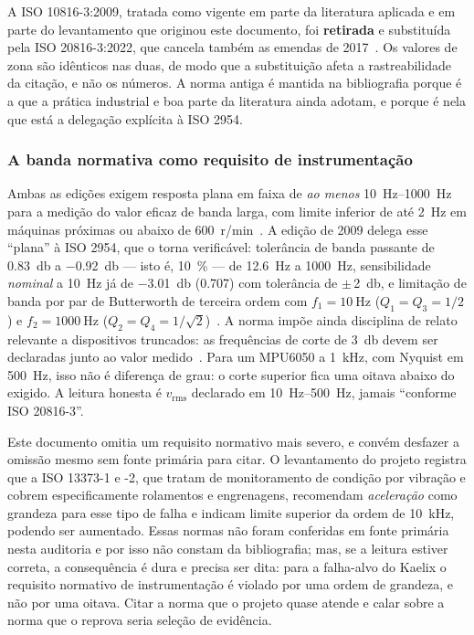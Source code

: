 \documentclass[11pt,a4paper]{article}
\begin{document}
A ISO 10816-3:2009, tratada como vigente em parte da literatura aplicada e em parte do
levantamento que originou este documento, foi \textbf{retirada} e substituída pela
ISO 20816-3:2022, que cancela também as emendas de
2017~\cite{iso108163_2009,iso208163_2022}. Os valores de zona são idênticos nas duas, de
modo que a substituição afeta a rastreabilidade da citação, e não os números. A norma
antiga é mantida na bibliografia porque é a que a prática industrial e boa parte da
literatura ainda adotam, e porque é nela que está a delegação explícita à ISO 2954.

\subsubsection{A banda normativa como requisito de instrumentação}

Ambas as edições exigem resposta plana em faixa de \emph{ao menos}
\SIrange{10}{1000}{\hertz} para a medição do valor eficaz de banda larga, com limite
inferior de até \SI{2}{\hertz} em máquinas próximas ou abaixo de
\num{600}~r/min~\cite{iso108163_2009,iso208163_2022}. A edição de 2009 delega esse
``plana'' à ISO 2954, que o torna verificável: tolerância de banda passante de
\SI{+0,83}{\decibel} a \SI{-0,92}{\decibel} --- isto é, \SI{10}{\percent} --- de
\SI{12,6}{\hertz} a \SI{1000}{\hertz}, sensibilidade \emph{nominal} a \SI{10}{\hertz} já
de \SI{-3,01}{\decibel} (\num{0,707}) com tolerância de $\pm$\,\SI{2}{\decibel}, e
limitação de banda por par de Butterworth de terceira ordem com $f_1=\SI{10}{\hertz}$
($Q_1=Q_3=1/2$) e $f_2=\SI{1000}{\hertz}$ ($Q_2=Q_4=1/\sqrt{2}$)~\cite{iso2954_2012}. A
norma impõe ainda disciplina de relato relevante a dispositivos truncados: as
frequências de corte de \SI{3}{\decibel} devem ser declaradas junto ao valor
medido~\cite{iso2954_2012}. Para um MPU6050 a \SI{1}{\kilo\hertz}, com Nyquist em
\SI{500}{\hertz}, isso não é diferença de grau: o corte superior fica uma oitava abaixo do
exigido. A leitura honesta é $v_{\mathrm{rms}}$ declarado em
\SIrange{10}{500}{\hertz}, jamais ``conforme ISO 20816-3''.

Este documento omitia um requisito normativo mais severo, e convém desfazer a omissão
mesmo sem fonte primária para citar. O levantamento do projeto registra que a ISO 13373-1
e -2, que tratam de monitoramento de condição por vibração e cobrem especificamente
rolamentos e engrenagens, recomendam \emph{aceleração} como grandeza para esse tipo de
falha e indicam limite superior da ordem de \SI{10}{\kilo\hertz}, podendo ser aumentado.
Essas normas não foram conferidas em fonte primária nesta auditoria e por isso não constam
da bibliografia; mas, se a leitura estiver correta, a consequência é dura e precisa ser
dita: para a falha-alvo do Kaelix o requisito normativo de instrumentação é violado por
uma ordem de grandeza, e não por uma oitava. Citar a norma que o projeto quase atende e
calar sobre a norma que o reprova seria seleção de evidência.
\end{document}
